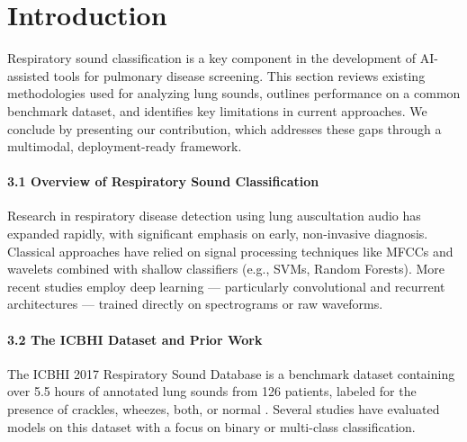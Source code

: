 \section{Introduction}
Respiratory sound classification is a key component in the development of AI-assisted tools for pulmonary disease screening. This section reviews existing methodologies used for analyzing lung sounds, outlines performance on a common benchmark dataset, and identifies key limitations in current approaches. We conclude by presenting our contribution, which addresses these gaps through a multimodal, deployment-ready framework.

\newpage

\paragraph{3.1 Overview of Respiratory Sound Classification\\}
Research in respiratory disease detection using lung auscultation audio has expanded rapidly, with significant emphasis on early, non-invasive diagnosis. Classical approaches have relied on signal processing techniques like MFCCs and wavelets combined with shallow classifiers (e.g., SVMs, Random Forests). More recent studies employ deep learning — particularly convolutional and recurrent architectures — trained directly on spectrograms or raw waveforms.

\paragraph{3.2 The ICBHI Dataset and Prior Work\\}
The ICBHI 2017 Respiratory Sound Database is a benchmark dataset containing over 5.5 hours of annotated lung sounds from 126 patients, labeled for the presence of crackles, wheezes, both, or normal \cite{rocha2017open}. Several studies have evaluated models on this dataset with a focus on binary or multi-class classification.

